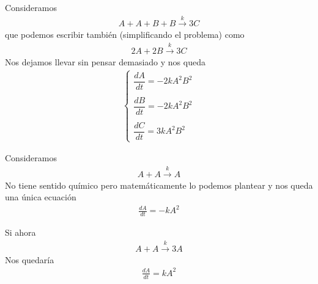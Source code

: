 \documentclass[12pt]{book}
\begin{document}



    \begin{ejemplo}
        Consideramos 
        \begin{gather*}
            A+A+B+B \overset{k}{\longrightarrow} 3C
        \end{gather*}
        que podemos escribir también (simplificando el problema) como 
        \begin{gather*}
            2A + 2 B \overset{k}{\longrightarrow} 3C
        \end{gather*}
        Nos dejamos llevar sin pensar demasiado y nos queda
        \begin{gather*}
            \left\{
                \begin{array}{l}
                    \dfrac{dA}{dt} = -2 k A^2B^2\\\\
                    \dfrac{dB}{dt} = -2 k A^2B^2\\\\
                    \dfrac{dC}{dt} = 3 k A^2B^2 
                \end{array}
            \right.
        \end{gather*}
    \end{ejemplo}

    \begin{ejemplo}
        Consideramos 
        \begin{gather*}
            A+A \overset{k}{\longrightarrow} A
        \end{gather*}
        No tiene sentido químico pero matemáticamente lo podemos plantear y nos queda una única ecuación
        \begin{gather*}
            \frac{dA}{dt} = -kA^2
        \end{gather*}

        Si ahora 
        \begin{gather*}
            A+A \overset{k}{\longrightarrow} 3A
        \end{gather*}
        Nos quedaría
        \begin{gather*}
            \frac{dA}{dt} = kA^2
        \end{gather*}
    \end{ejemplo}
\end{document}
